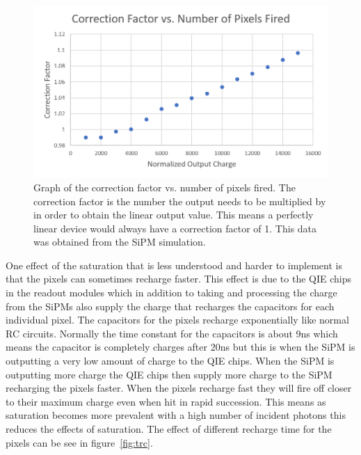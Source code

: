 \begin{figure}
\centering
\includegraphics[width=\linewidth]{Figures/CorFac.png}
\caption{Graph of the correction factor vs. number of pixels fired. The correction factor is the number the output needs to be multiplied by in order to obtain the linear output value. This means a perfectly linear device would always have a correction factor of 1. This data was obtained from the SiPM simulation.}
\label{fig:Cor}
\end{figure}

One effect of the saturation that is less understood and harder to implement is that the pixels can sometimes recharge faster. This effect is due to the QIE chips in the readout modules which in addition to taking and processing the charge from the SiPMs also supply the charge that recharges the capacitors for each individual pixel. The capacitors for the pixels recharge exponentially like normal RC circuits. Normally the time constant for the capacitors is about 9ns which means the capacitor is completely charges after 20ns but this is when the SiPM is outputting a very low amount of charge to the QIE chips. When the SiPM is outputting more charge the QIE chips then supply more charge to the SiPM recharging the pixels faster. When the pixels recharge fast they will fire off closer to their maximum charge even when hit in rapid succession. This means as saturation becomes more prevalent with a high number of incident photons this reduces the effects of saturation. The effect of different recharge time for the pixels can be see in figure~\ref{fig:trc}.

